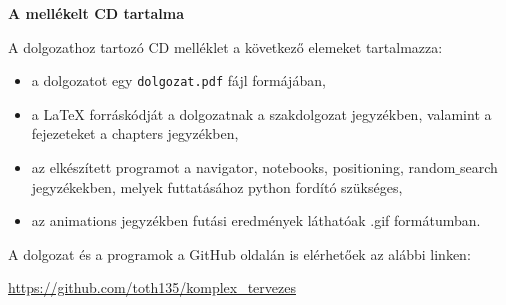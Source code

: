 \pagestyle{empty}

\noindent \textbf{\Large A mellékelt CD tartalma}

\vskip 1cm

A dolgozathoz tartozó CD melléklet a következő elemeket tartalmazza:

\begin{itemize}
\item a dolgozatot egy \texttt{dolgozat.pdf} fájl formájában,
\item a LaTeX forráskódját a dolgozatnak a szakdolgozat jegyzékben, valamint a fejezeteket a chapters jegyzékben,
\item az elkészített programot a navigator, notebooks, positioning, random$\_$search jegyzékekben, melyek futtatásához python fordító szükséges,
\item az animations jegyzékben futási eredmények láthatóak .gif formátumban.
\end{itemize}

A dolgozat és a programok a GitHub oldalán is elérhetőek az alábbi linken:

\medskip

\quad \quad \url{https://github.com/toth135/komplex_tervezes}
